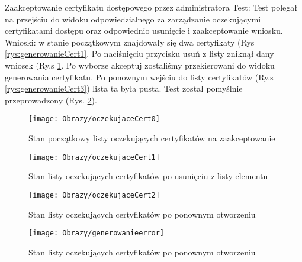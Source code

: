 \documentclass[twoside,10pt]{article}
\begin{document}
\begin{enumerate*}
\item  Zaakceptowanie certyfikatu dostępowego przez administratora \newline
Test: Test polegał na przejściu do widoku odpowiedzialnego za zarządzanie oczekującymi certyfikatami dostępu oraz odpowiednio usunięcie i zaakceptowanie wniosku.
\newline Wnioski: w stanie początkowym znajdowały się dwa certyfikaty (Rys \ref{rys:generowanieCert1}. Po naciśnięciu przycisku usuń z listy zniknął dany wniosek (Ry.s \ref{rys:generowanieCert2}. Po wyborze akceptuj zostaliśmy przekierowani do widoku generowania certyfikatu. Po ponownym wejściu do listy certyfikatów (Ry.s \ref{rys:generowanieCert3}) lista ta była pusta. Test został pomyślnie przeprowadzony (Rys. \ref{rys:generowanieCert4}). 
\begin{figure}[ht!]
\centering
\begin{minipage}{0.4\textwidth}
\texttt{[image: Obrazy/oczekujaceCert0]}
\caption{Stan początkowy listy oczekujących certyfikatów na zaakceptowanie }
\label{rys:generowanieCert1}
\end{minipage}
\hspace{0.01\textwidth}
\begin{minipage}{0.4\textwidth}
\texttt{[image: Obrazy/oczekujaceCert1]}
\caption{Stan listy oczekujących certyfikatów po usunięciu z listy elementu}
\label{rys:generowanieCert2}
\end{minipage}
\end{figure}

\begin{figure}
\centering
\begin{minipage}{0.4\textwidth}
\texttt{[image: Obrazy/oczekujaceCert2]}
\caption{Stan listy oczekujących certyfikatów po ponownym otworzeniu}
\label{rys:generowanieCert3}
\end{minipage}
\hspace{0.01\textwidth}
\begin{minipage}{0.4\textwidth}
\texttt{[image: Obrazy/generowanieerror]}
\caption{Stan listy oczekujących certyfikatów po ponownym otworzeniu}
\label{rys:generowanieCert4}
\end{minipage}
\end{figure}


\end{enumerate*}
\end{document}
